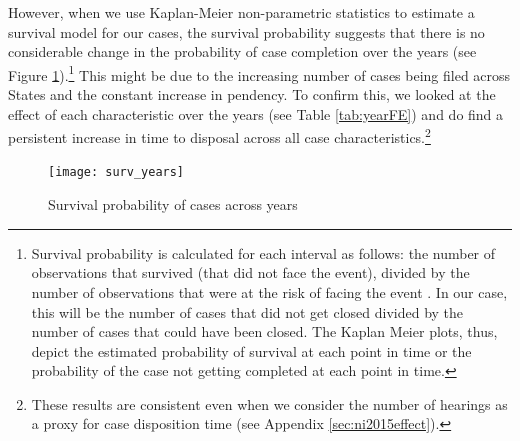 \documentclass[12pt,a4paper]{article}
\begin{document}
However, when we use Kaplan-Meier non-parametric statistics to estimate a survival model for our cases, the survival probability suggests that there is no considerable change in the probability of case completion over the years (see Figure \ref{fig:yearSurvival}).\footnote{Survival probability is calculated for each interval as follows: the number of observations that survived (that did not face the event), divided by the number of observations that were at the risk of facing the event \autocite{rich2010practical}. In our case, this will be the number of cases that did not get closed divided by the number of cases that could have been closed. The Kaplan Meier plots, thus, depict the estimated probability of survival at each point in time or the probability of the case not getting completed at each point in time.} This might be due to the increasing number of cases being filed across States and the constant increase in pendency. To confirm this, we looked at the effect of each characteristic over the years (see Table \ref{tab:yearFE}) and do find a persistent increase in time to disposal across all case characteristics.\footnote{These results are consistent even when we consider the number of hearings as a proxy for case disposition time (see Appendix \ref{sec:ni2015effect}).}

\begin{figure}[ht]
\centering
\caption{Survival probability of cases across years}\label{fig:yearSurvival}
\texttt{[image: surv\_years]}
\end{figure}
\end{document}

